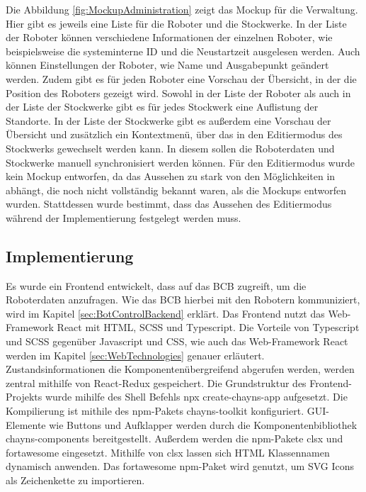 Die Abbildung \ref{fig:MockupAdministration} zeigt das Mockup für die Verwaltung. Hier gibt es jeweils eine Liste für die Roboter und die Stockwerke. In der Liste der Roboter können verschiedene Informationen der einzelnen Roboter, wie beispielsweise die systeminterne \ac{ID} und die Neustartzeit ausgelesen werden. Auch können Einstellungen der Roboter, wie Name und Ausgabepunkt geändert werden. Zudem gibt es für jeden Roboter eine Vorschau der Übersicht, in der die Position des Roboters gezeigt wird. Sowohl in der Liste der Roboter als auch in der Liste der Stockwerke gibt es für jedes Stockwerk eine Auflistung der Standorte. In der Liste der Stockwerke gibt es außerdem eine Vorschau der Übersicht und zusätzlich ein Kontextmenü, über das in den Editiermodus des Stockwerks gewechselt werden kann. In diesem sollen die Roboterdaten und Stockwerke manuell synchronisiert werden können. Für den Editiermodus wurde kein Mockup entworfen, da das Aussehen zu stark von den Möglichkeiten in \deckgl{} abhängt, die noch nicht vollständig bekannt waren, als die Mockups entworfen wurden. Stattdessen wurde bestimmt, dass das Aussehen des Editiermodus während der Implementierung festgelegt werden muss.

\subsection{Implementierung}
Es wurde ein Frontend entwickelt, dass auf das \ac{BCB} zugreift, um die Roboterdaten anzufragen. Wie das \ac{BCB} hierbei mit den Robotern kommuniziert, wird im Kapitel \ref{sec:BotControlBackend} erklärt. Das Frontend nutzt das Web-Framework React mit \ac{HTML}, \ac{SCSS} und Typescript. Die Vorteile von Typescript und \ac{SCSS} gegenüber Javascript und \ac{CSS}, wie auch das Web-Framework React werden im Kapitel \ref{sec:WebTechnologies} genauer erläutert.
Zustandsinformationen die Komponentenübergreifend abgerufen werden, werden zentral mithilfe von React-Redux gespeichert. Die Grundstruktur des Frontend-Projekts wurde mihilfe des Shell Befehls npx create-chayns-app \cite{CreateChaynsApp} aufgesetzt. Die Kompilierung ist mithile des \ac{npm}-Pakets chayns-toolkit \cite{ChaynsToolkit} konfiguriert. \ac{GUI}-Elemente wie Buttons und Aufklapper werden durch die Komponentenbibliothek chayns-components \cite{ChaynsComponents} bereitgestellt. Außerdem werden die \ac{npm}-Pakete clsx \cite{clsx} und fortawesome \cite{fontawesome} eingesetzt. Mithilfe von clsx lassen sich HTML Klassennamen dynamisch anwenden. Das fortawesome \ac{npm}-Paket wird genutzt, um \ac{SVG} Icons als Zeichenkette zu importieren.

